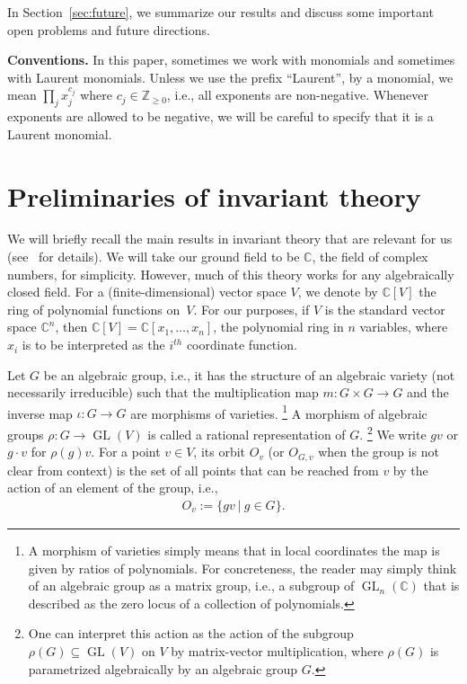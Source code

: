 \documentclass[10pt,a4paper]{article}
\DeclareMathOperator{\GL}{GL}
\theoremstyle{definition}
\numberwithin{equation}{section}
\newcommand{\CC}{\mathbb{C}}
\newcommand{\NN}{\mathbb{Z}_{\geq 0}}
\begin{document}
In Section~\ref{sec:future}, we summarize our results and discuss some important open problems and future directions.

%
\medskip\noindent\textbf{Conventions.}
%
In this paper, sometimes we work with monomials and sometimes with Laurent monomials.
Unless we use the prefix ``Laurent'', by a monomial, we mean $\prod_j x_j^{c_j}$ where $c_j \in \NN$, i.e., all exponents are non-negative.
Whenever exponents are allowed to be negative, we will be careful to specify that it is a Laurent monomial.


%
\section{Preliminaries of invariant theory}\label{sec:inv}
%
We will briefly recall the main results in invariant theory that are relevant for us (see~\cite{kraft,dolgachev:03,DK,Mumford-book} for details).
We will take our ground field to be $\CC$, the field of complex numbers, for simplicity.
However, much of this theory works for any algebraically closed field.
For a (finite-dimensional) vector space $V$, we denote by $\CC[V]$ the ring of polynomial functions on~$V$.
For our purposes, if $V$ is the standard vector space $\CC^n$, then $\CC[V] = \CC[x_1,\dots,x_n]$, the polynomial ring in $n$ variables, where $x_i$ is to be interpreted as the $i^{th}$ coordinate function.

Let $G$ be an algebraic group, i.e., it has the structure of an algebraic variety (not necessarily irreducible) such that the multiplication map $m\colon G \times G \rightarrow G$ and the inverse map $\iota\colon G \rightarrow G$ are morphisms of varieties.
\footnote{A morphism of varieties simply means that in local coordinates the map is given by ratios of polynomials. For concreteness, the reader may simply think of an algebraic group as a matrix group, i.e., a subgroup of $\GL_n(\CC)$ that is described as the zero locus of a collection of polynomials.}
A morphism of algebraic groups $\rho: G \rightarrow \GL(V)$ is called a rational representation of $G$.
\footnote{One can interpret this action as the action of the subgroup $\rho(G) \subseteq \GL(V)$ on $V$ by matrix-vector multiplication, where $\rho(G)$ is parametrized algebraically by an algebraic group $G$.}
%
We write $gv$ or $g \cdot v$ for $\rho(g) v$.
For a point $v \in V$, its orbit $O_v$ (or $O_{G,v}$ when the group is not clear from context) is the set of all points that can be reached from $v$ by the action of an element of the group, i.e.,
\begin{align*}
  O_v := \{gv \ |\ g \in G\}.
\end{align*}
\end{document}
